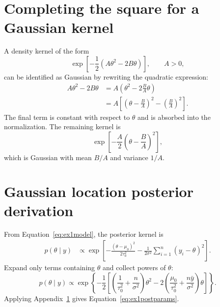 \documentclass[11pt,a4paper]{article}
\begin{document}
\section{Completing the square for a Gaussian kernel}
\label{app:square}
A density kernel of the form
\begin{equation}
 \exp\left[-\frac12(A\theta^2-2B\theta)\right],
 \qquad A>0,
\end{equation}
can be identified as Gaussian by rewriting the quadratic expression:
\begin{align}
 A\theta^2-2B\theta
 &=A\left(\theta^2-2\frac{B}{A}\theta\right)\\
 &=A\left[\left(\theta-\frac BA\right)^2-\left(\frac BA\right)^2\right].
\end{align}
The final term is constant with respect to \(\theta\) and is absorbed into the normalization. The remaining kernel is
\begin{equation}
 \exp\left[-\frac{A}{2}\left(\theta-\frac BA\right)^2\right],
\end{equation}
which is Gaussian with mean \(B/A\) and variance \(1/A\).

\section{Gaussian location posterior derivation}
\label{app:gaussianmean}
From Equation~\eqref{eq:ex1model}, the posterior kernel is
\begin{align}
 p(\theta\mid y)
 &\propto
 \exp\left[-\frac{(\theta-\mu_0)^2}{2\tau_0^2}
 -\frac{1}{2\sigma^2}\sum_{i=1}^{n}(y_i-\theta)^2\right].
\end{align}
Expand only terms containing \(\theta\) and collect powers of \(\theta\):
\begin{equation}
 p(\theta\mid y)\propto
 \exp\left\{-\frac12\left[
 \left(\frac1{\tau_0^2}+\frac n{\sigma^2}\right)\theta^2
 -2\left(\frac{\mu_0}{\tau_0^2}+\frac{n\bar y}{\sigma^2}\right)\theta
 \right]\right\}.
\end{equation}
Applying Appendix~\ref{app:square} gives Equation~\eqref{eq:ex1postparams}.
\end{document}
